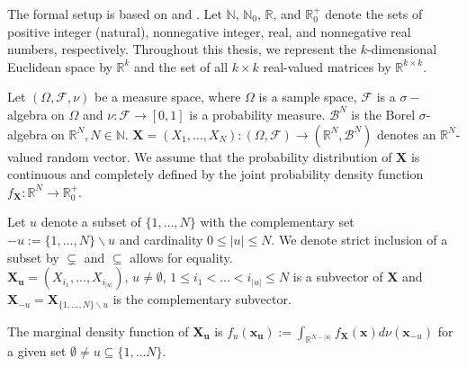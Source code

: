 The formal setup is based on \cite{rahman2014} and \cite{chastaing2012}.
Let $\mathbb{N}$, $\mathbb{N}_0$, $\mathbb{R}$, and $\mathbb{R}_0^{+}$ denote the sets of positive integer (natural), nonnegative integer, real, and nonnegative real numbers, respectively. Throughout this thesis, we represent the $k$-dimensional Euclidean space by $\mathbb{R}^k$ and the set of all $k \times k$ real-valued matrices by $\mathbb{R}^{k \times k}$.

Let $(\Omega, \mathcal{F}, \nu)$ be a measure space, where $\Omega$ is a sample space, $\mathcal{F}$ is a $\sigma-$algebra on $\Omega$ and $\nu: \mathcal{F} \rightarrow [0, 1]$ is a probability measure. $\mathcal{B}^N$ is the Borel $\sigma$-algebra on $\mathbb{R}^N, N \in \mathbb{N}$.
$\boldsymbol{X} = (X_1, \dots, X_N): (\Omega, \mathcal{F}) \rightarrow (\mathbb{R}^N, \mathcal{B}^N)$ denotes an $\mathbb{R}^N$-valued random vector.
We assume that the probability distribution of $\boldsymbol{X}$ is continuous and completely defined by the joint probability density function $f_{\boldsymbol{X}}: \mathbb{R}^N \rightarrow \mathbb{R}_{0}^+$. %

Let $u$ denote a subset of $\{1, \dots, N\}$ with the complementary set  $-u := \{1, \dots, N\} \backslash{} u$ and cardinality $0 \leq |u| \leq N$. We denote strict inclusion of a subset by $\subsetneq$ and $\subseteq$ allows for equality.
$\boldsymbol{X_u} = (X_{i_1}, \dots, X_{i_{|u|}}), \, u \neq \emptyset, \, 1 \leq i_1 < \dots < i_{|u|} \leq N$ is a subvector of $\boldsymbol{X}$ and $\boldsymbol{X}_{-u} = \boldsymbol{X}_{\{1, \dots, N\} \backslash{} u}$ is the complementary subvector.

The marginal density function of $\boldsymbol{X_u}$ is $f_u(\boldsymbol{x_u}) := \int_{\mathbb{R}^{N-|u|}} f_{\boldsymbol{X}}(\boldsymbol{x})d \nu (\boldsymbol{x}_{-u})$ for a given set $\emptyset \neq u \subseteq \{1, \dots N\}$.

